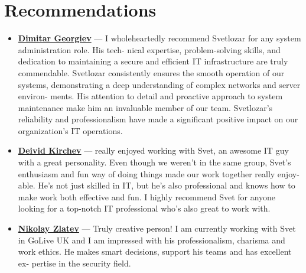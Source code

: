 \documentclass[letterpaper,10pt]{article}
\begin{document}
\begin{minipage}[t]{0.5\textwidth}
		\section*{Recommendations}
		\begin{itemize}
			\fontsize{8}{9}\selectfont
			\item \textbf{\href{https://www.linkedin.com/in/dimitar-georgiev-29a6ab144/}{Dimitar Georgiev}} — I wholeheartedly recommend
			Svetlozar for any system administration role. His tech-
			nical expertise, problem-solving skills, and dedication to
			maintaining a secure and efficient IT infrastructure are
			truly commendable. Svetlozar consistently ensures the
			smooth operation of our systems, demonstrating a deep
			understanding of complex networks and server environ-
			ments. His attention to detail and proactive approach to
			system maintenance make him an invaluable member of
			our team. Svetlozar’s reliability and professionalism have
			made a significant positive impact on our organization’s
			IT operations.
			\item \textbf{\href{https://www.linkedin.com/in/deivid-kirchev-00378b252/}{Deivid Kirchev}} —  really enjoyed working with Svet,
			an awesome IT guy with a great personality. Even though
			we weren’t in the same group, Svet’s enthusiasm and fun
			way of doing things made our work together really enjoy-
			able. He’s not just skilled in IT, but he’s also professional
			and knows how to make work both effective and fun. I
			highly recommend Svet for anyone looking for a top-notch
			IT professional who’s also great to work with.
			\item \textbf{\href{https://www.linkedin.com/in/nikolay-zlatev/}{Nikolay Zlatev}} — Truly creative person! I am currently
			working with Svet in GoLive UK and I am impressed with
			his professionalism, charisma and work ethics. He makes
			smart decisions, support his teams and has excellent ex-
			pertise in the security field.
		\end{itemize}
	\end{minipage}
	
\end{document}
